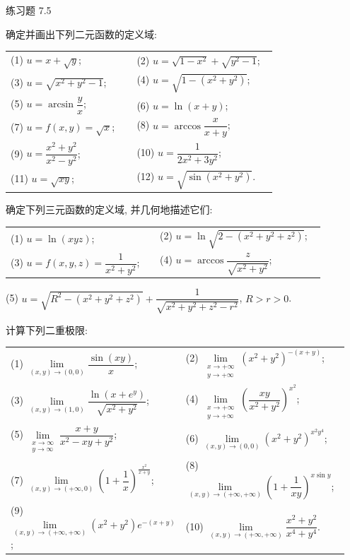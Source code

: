 \begin{exblock}{练习题 7.5}
  \item 确定并画出下列二元函数的定义域:

  \begin{tabular}{@{}p{0.45\linewidth}p{0.50\linewidth}@{}}
    (1) $u = x + \sqrt{y}$; & (2) $u = \sqrt{1 - x^{2}} + \sqrt{y^{2} - 1}$; \\
    (3) $u = \sqrt{x^{2} + y^{2} - 1}$; & (4) $u = \sqrt{1 - (x^{2} + y^{2})}$; \\
    (5) $u = \arcsin\dfrac{y}{x}$; & (6) $u = \ln(x + y)$; \\
    (7) $u = f(x, y) = \sqrt{x}$; & (8) $u = \arccos\dfrac{x}{x + y}$; \\
    (9) $u = \dfrac{x^{2} + y^{2}}{x^{2} - y^{2}}$; & (10) $u = \dfrac{1}{2x^{2} + 3y^{2}}$; \\
    (11) $u = \sqrt{xy}$; & (12) $u = \sqrt{\sin(x^{2} + y^{2})}$.
  \end{tabular}

  \item 确定下列三元函数的定义域, 并几何地描述它们:

  \begin{tabular}{@{}p{0.45\linewidth}p{0.50\linewidth}@{}}
    (1) $u = \ln(xyz)$; & (2) $u = \ln\sqrt{2 - (x^{2} + y^{2} + z^{2})}$; \\
    (3) $u = f(x, y, z) = \dfrac{1}{x^{2} + y^{2}}$; & (4) $u = \arccos\dfrac{z}{\sqrt{x^{2} + y^{2}}}$;
  \end{tabular}
  (5) $u = \sqrt{R^{2} - (x^{2} + y^{2} + z^{2})} + \dfrac{1}{\sqrt{x^{2} + y^{2} + z^{2} - r^{2}}}$, $R > r > 0$.

  \item 计算下列二重极限:

  \begin{tabular}{@{}p{0.45\linewidth}p{0.50\linewidth}@{}}
    (1) $\lim\limits_{(x, y) \to (0, 0)} \dfrac{\sin(xy)}{x}$; & (2) $\lim\limits_{\substack{x \to +\infty \\ y \to +\infty}} (x^{2} + y^{2})^{-(x + y)}$; \\[3mm]
    (3) $\lim\limits_{(x, y) \to (1, 0)} \dfrac{\ln(x + e^{y})}{\sqrt{x^{2} + y^{2}}}$; & (4) $\lim\limits_{\substack{x \to +\infty \\ y \to +\infty}} \left(\dfrac{xy}{x^{2} + y^{2}}\right)^{x^{2}}$; \\[3mm]
    (5) $\lim\limits_{\substack{x \to \infty \\ y \to \infty}} \dfrac{x + y}{x^{2} - xy + y^{2}}$; & (6) $\lim\limits_{(x, y) \to (0, 0)} (x^{2} + y^{2})^{x^{2}y^{4}}$; \\[3mm]
    (7) $\lim\limits_{(x, y) \to (+\infty, 0)} \left(1 + \dfrac{1}{x}\right)^{\frac{x^{2}}{x + y}}$; & (8) $\lim\limits_{(x, y) \to (+\infty, +\infty)} \left(1 + \dfrac{1}{xy}\right)^{x\sin y}$; \\[3mm]
    (9) $\lim\limits_{(x, y) \to (+\infty, +\infty)} (x^{2} + y^{2})e^{-(x + y)}$; & (10) $\lim\limits_{(x, y) \to (+\infty, +\infty)} \dfrac{x^{2} + y^{2}}{x^{4} + y^{4}}$.
  \end{tabular}


\end{exblock}

